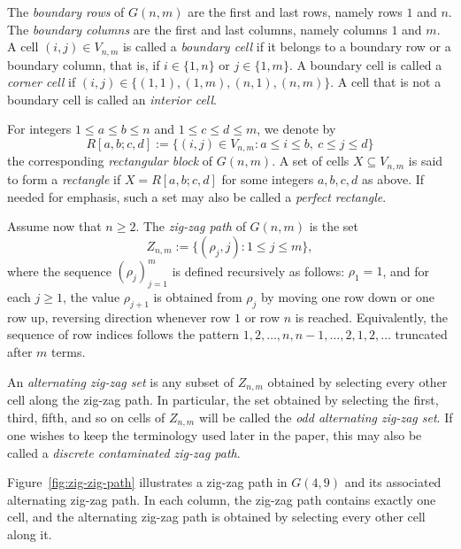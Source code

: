 \documentclass[letterpaper,12pt]{article}
\begin{document}
The \emph{boundary rows} of $G(n,m)$ are the first and last rows, namely rows $1$ and $n$.
The \emph{boundary columns} are the first and last columns, namely columns $1$ and $m$.
A cell $(i,j)\in V_{n,m}$ is called a \emph{boundary cell} if it belongs to a boundary row or a
boundary column, that is, if $i\in\{1,n\}$ or $j\in\{1,m\}$.
A boundary cell is called a \emph{corner cell} if $(i,j)\in\{(1,1),(1,m),(n,1),(n,m)\}$. A cell that is not a boundary cell is called an \emph{interior cell}.

For integers $1\le a\le b\le n$ and $1\le c\le d\le m$, we denote by
\[
R[a,b;c,d]:=\{(i,j)\in V_{n,m}: a\le i\le b,\ c\le j\le d\}
\]
the corresponding \emph{rectangular block} of $G(n,m)$.
A set of cells $X\subseteq V_{n,m}$ is said to form a \emph{rectangle} if
$X=R[a,b;c,d]$ for some integers $a,b,c,d$ as above. If needed for emphasis, such a set may also be called a
\emph{perfect rectangle}.


Assume now that $n\ge 2$. The \emph{zig-zag path} of $G(n,m)$ is the set
\[
Z_{n,m}:=\{(\rho_j,j): 1\le j\le m\},
\]
where the sequence $(\rho_j)_{j=1}^m$ is defined recursively as follows: $\rho_1=1$, and for each $j\ge 1$, the value $\rho_{j+1}$ is obtained from $\rho_j$ by moving one row down
or one row up, reversing direction whenever row $1$ or row $n$ is reached. Equivalently,
the sequence of row indices follows the pattern $1,2,\dots,n,n-1,\dots,2,1,2,\dots$ truncated after $m$ terms. 

An \emph{alternating zig-zag set} is any subset of $Z_{n,m}$ obtained by selecting every other cell
along the zig-zag path. In particular, the set obtained by selecting the first, third, fifth, and so on
cells of $Z_{n,m}$ will be called the \emph{odd alternating zig-zag set}. If one wishes to keep the
terminology used later in the paper, this may also be called a \emph{discrete contaminated zig-zag path}.

Figure~\ref{fig:zig-zig-path} illustrates a zig-zag path in $G(4,9)$ and its associated alternating zig-zag path. In each column, the zig-zag path contains exactly one cell, and the alternating zig-zag path is obtained by selecting every other cell along it.

 
\end{document}
